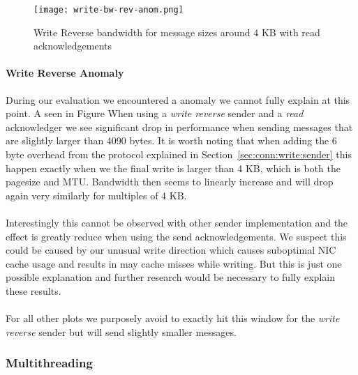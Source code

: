 \begin{figure}[h]
\texttt{[image: write-bw-rev-anom.png]}
\caption{Write Reverse bandwidth for message sizes around 4 KB with read acknowledgements}
\label{fig:plot-write-rev-anom}
\end{figure}

\paragraph{Write Reverse Anomaly} During our evaluation we encountered a anomaly we cannot fully explain at
this point. A seen in Figure  When using a \emph{write reverse} sender and a \emph{read} acknowledger we see 
significant drop in performance when sending messages that are slightly larger than 4090 bytes. It is worth 
noting that when adding the 6 byte overhead from the protocol explained in Section~\ref{sec:conn:write:sender}
this happen exactly when we the final write is larger than 4 KB, which is both the pagesize and MTU. Bandwidth
then seems to linearly increase and will drop again very similarly for multiples of 4 KB.

\paragraph{} Interestingly this cannot be observed with other sender implementation and the effect is greatly
reduce when using the send acknowledgements. We suspect this could be caused by our unusual write direction 
which causes suboptimal NIC cache usage and results in may cache misses while writing.
But this is just one  possible explanation and further research would be necessary to fully explain these
results.

\paragraph{} For all other plots we purposely avoid to exactly hit this window for the \emph{write reverse}
sender but will send slightly smaller messages.

\subsubsection{Multithreading}



